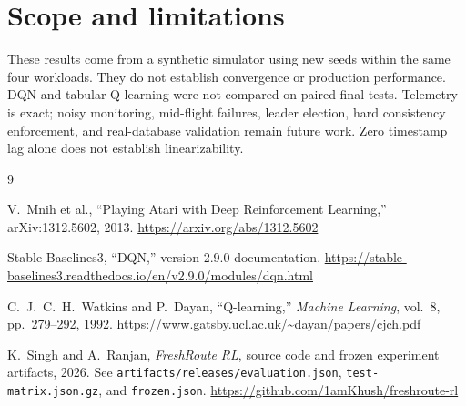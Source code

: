 \documentclass[10pt,a4paper,twocolumn]{article}
\begin{document}
\section{Scope and limitations}
These results come from a synthetic simulator using new seeds within the same
four workloads. They do not establish convergence or production performance.
DQN and tabular Q-learning were not compared on paired final tests. Telemetry
is exact; noisy monitoring, mid-flight failures, leader election, hard
consistency enforcement, and real-database validation remain future work.
Zero timestamp lag alone does not establish linearizability.

\begin{thebibliography}{9}
\small\raggedright
{}
V.~Mnih et al., ``Playing Atari with Deep Reinforcement Learning,''
arXiv:1312.5602, 2013.
\url{https://arxiv.org/abs/1312.5602}

Stable-Baselines3, ``DQN,'' version 2.9.0 documentation.
\url{https://stable-baselines3.readthedocs.io/en/v2.9.0/modules/dqn.html}

C.~J.~C.~H.~Watkins and P.~Dayan, ``Q-learning,''
\emph{Machine Learning}, vol.~8, pp.~279--292, 1992.
\url{https://www.gatsby.ucl.ac.uk/~dayan/papers/cjch.pdf}

K.~Singh and A.~Ranjan, \emph{FreshRoute RL}, source code and frozen
experiment artifacts, 2026. See \texttt{artifacts/releases/evaluation.json},
\texttt{test-matrix.json.gz}, and \texttt{frozen.json}.
\url{https://github.com/1amKhush/freshroute-rl}
\end{thebibliography}
\end{document}

